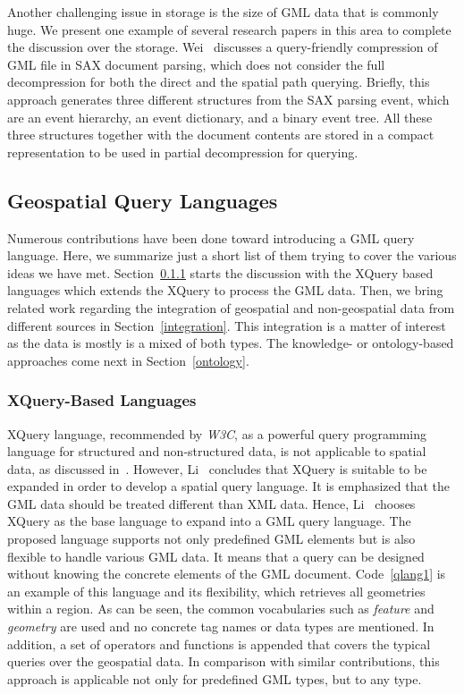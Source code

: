 \documentclass[a4paper,12pt]{article}
\begin{document}
Another challenging issue in storage is the size of GML data that is commonly huge. 
We present one example of several research papers in this area to complete the discussion over the storage.
Wei~\cite{Wei2011} discusses a query-friendly compression of GML file in SAX document 
parsing, which does not consider the full decompression for both the direct and the spatial path querying. 
Briefly, this approach generates three different structures from the SAX parsing event,
which are an event hierarchy, an event dictionary, and a binary event tree.
All these three structures together with the document contents are stored in a compact
representation to be used in partial decompression for querying.%

\subsection{Geospatial Query Languages}
\label{queryLang}
Numerous contributions have been done toward introducing a GML query language.
Here, we summarize just a short list of them trying to cover the various ideas we have met. %
Section~\ref{xquery-based} starts the discussion with the XQuery based languages which extends the XQuery
to process the GML data.
Then, we bring related work regarding the integration of geospatial and non-geospatial
data from different sources in Section~\ref{integration}. This integration is a matter of interest
as the data is mostly is a mixed of both types. The knowledge- or ontology-based approaches 
come next in Section~\ref{ontology}.

\subsubsection{XQuery-Based Languages}
\label{xquery-based}
XQuery language, recommended by \emph{W3C}, as a powerful query programming language for structured and non-structured data, 
is not applicable to spatial data, as discussed in~\cite{Lisa2006,Chen2010}. 
However, Li~\cite{Lisa2006} concludes that XQuery is suitable to be expanded in order to develop a spatial query language.
It is emphasized that the GML data should be treated different than XML data. Hence, Li~\cite{Lisa2006} chooses XQuery as the base language to expand into a GML query language. The proposed language supports not only predefined GML elements but is also flexible to handle various GML data. 
It means that a query can be designed without knowing the concrete elements of the GML document.
Code~\ref{qlang1} is an example of this language and its flexibility,
which retrieves all geometries within a region. As can be seen, 
the common vocabularies such as \textit{feature} and \textit{geometry} are used and no concrete tag names or data types are mentioned.
In addition, a set of operators and functions is appended that covers the typical queries over the geospatial data. 
In comparison with similar contributions, this approach is applicable not only for predefined GML types, but to any type.
\end{document}
